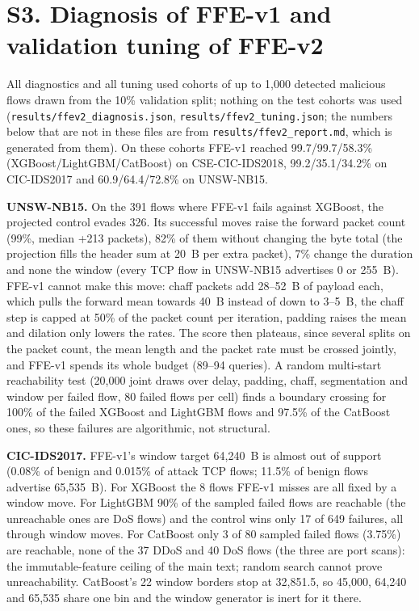 \section*{S3. Diagnosis of FFE-v1 and validation tuning of FFE-v2}

All diagnostics and all tuning used cohorts of up to 1,000 detected malicious flows drawn from the 10\% validation split; nothing on the test cohorts was used (\texttt{results/ffev2\_diagnosis.json}, \texttt{results/ffev2\_tuning.json}; the numbers below that are not in these files are from \texttt{results/ffev2\_report.md}, which is generated from them). On these cohorts FFE-v1 reached 99.7/99.7/58.3\% (XGBoost/LightGBM/CatBoost) on CSE-CIC-IDS2018, 99.2/35.1/34.2\% on CIC-IDS2017 and 60.9/64.4/72.8\% on UNSW-NB15.

\textbf{UNSW-NB15.} On the 391 flows where FFE-v1 fails against XGBoost, the projected control evades 326. Its successful moves raise the forward packet count (99\%, median +213 packets), 82\% of them without changing the byte total (the projection fills the header sum at 20~B per extra packet), 7\% change the duration and none the window (every TCP flow in UNSW-NB15 advertises 0 or 255~B). FFE-v1 cannot make this move: chaff packets add 28--52~B of payload each, which pulls the forward mean towards 40~B instead of down to 3--5~B, the chaff step is capped at 50\% of the packet count per iteration, padding raises the mean and dilation only lowers the rates. The score then plateaus, since several splits on the packet count, the mean length and the packet rate must be crossed jointly, and FFE-v1 spends its whole budget (89--94 queries). A random multi-start reachability test (20,000 joint draws over delay, padding, chaff, segmentation and window per failed flow, 80 failed flows per cell) finds a boundary crossing for 100\% of the failed XGBoost and LightGBM flows and 97.5\% of the CatBoost ones, so these failures are algorithmic, not structural.

\textbf{CIC-IDS2017.} FFE-v1's window target 64,240~B is almost out of support (0.08\% of benign and 0.015\% of attack TCP flows; 11.5\% of benign flows advertise 65,535~B). For XGBoost the 8 flows FFE-v1 misses are all fixed by a window move. For LightGBM 90\% of the sampled failed flows are reachable (the unreachable ones are DoS flows) and the control wins only 17 of 649 failures, all through window moves. For CatBoost only 3 of 80 sampled failed flows (3.75\%) are reachable, none of the 37 DDoS and 40 DoS flows (the three are port scans): the immutable-feature ceiling of the main text; random search cannot prove unreachability. CatBoost's 22 window borders stop at 32,851.5, so 45,000, 64,240 and 65,535 share one bin and the window generator is inert for it there.

